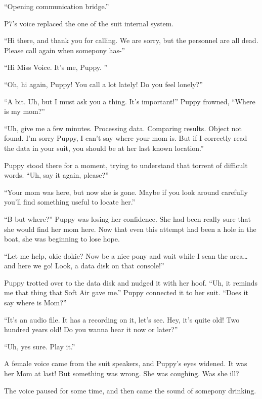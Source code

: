 {\mt ``Opening communication bridge.''}

P7's voice replaced the one of the suit internal system.

``Hi there, and thank you for calling. We are sorry, but the personnel are all dead. Please call again when somepony has-''

``Hi Miss Voice. It's me, Puppy. ''

``Oh, hi again, Puppy! You call a lot lately! Do you feel lonely?''

``A bit. Uh, but I must ask you a thing. It's important!'' Puppy frowned, ``Where is my mom?''

``Uh, give me a few minutes. Processing data. Comparing results. Object not found. I'm sorry Puppy, I can't say where your mom is. But if I correctly read the data in your suit, you should be at her last known location.''

Puppy stood there for a moment, trying to understand that torrent of difficult words. ``Uh, say it again, please?''

``Your mom was here, but now she is gone. Maybe if you look around carefully you'll find something useful to locate her.''

``B-but where?'' Puppy was losing her confidence. She had been really sure that she would find her mom here. Now that even this attempt had been a hole in the boat, she was beginning to lose hope.

``Let me help, okie dokie? Now be a nice pony and wait while I scan the area\dots and here we go! Look, a data disk on that console!''

Puppy trotted over to the data disk and nudged it with her hoof. ``Uh, it reminds me that thing that Soft Air gave me.'' Puppy connected it to her suit. ``Does it say where is Mom?''

``It's an audio file. It has a recording on it, let's see. Hey, it's quite old! Two hundred years old! Do you wanna hear it now or later?''

``Uh, yes sure. Play it.''

A female voice came from the suit speakers, and Puppy's eyes widened. It was her Mom at last! But something was wrong. She was coughing. Was she ill?


The voice paused for some time, and then came the sound of somepony drinking.

